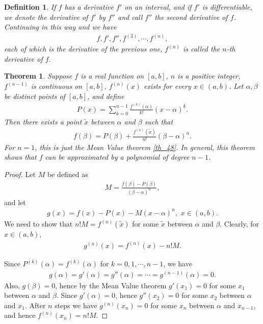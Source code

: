 \documentclass[11pt]{book}
\newtheorem{definition}{Definition}[chapter]
\newtheorem{theorem}{Theorem}[chapter]
\theoremstyle{definition}
\numberwithin{equation}{chapter}
\begin{document}
\begin{definition}
If $f$ has a derivative $f'$ on an interval, and if $f'$ is differentiable, we denote the derivative of $f'$ by $f''$ and call $f''$ the second derivative of $f$. Continuing in this way and we have
\begin{align*}
    f, f', f'', f^{(3)}, \cdots, f^{(n)},
\end{align*}
each of which is the derivative of the previous one, $f^{(n)}$ is called the $n$-th derivative of $f$.
\end{definition}

\medskip

\begin{theorem}
Suppose $f$ is a real function on $[a,b]$, $n$ is a positive integer, $f^{(n-1)}$ is continuous on $[a,b]$, $f^{(n)}(x)$ exists for every $x \in (a,b)$. Let $\alpha, \beta$ be distinct points of $[a,b]$, and define
\begin{align*}
    P(x) = \sum^{n-1}_{k=0} \frac{f^{(k)}(\alpha)}{k!} (x - \alpha)^k.
\end{align*}
Then there exists a point $\widetilde{x}$ between $\alpha$ and $\beta$ such that
\begin{align*}
    f(\beta) = P(\beta) + \frac{f^{(n)}(\widetilde{x})}{n!} (\beta - \alpha)^n.
\end{align*}
For $n = 1$, this is just the Mean Value theorem \ref{th_48}. In general, this theorem shows that $f$ can be approximated by a polynomial of degree $n - 1$.
\end{theorem}
\begin{proof}
Let $M$ be defined as 
\begin{align*}
    M = \frac{f(\beta) - P(\beta)}{(\beta - \alpha)^n},
\end{align*}
and let 
\begin{align*}
    g(x) = f(x) - P(x) - M(x - \alpha)^n, \,\, x \in (a,b).
\end{align*}
We need to show that $n!M = f^{(n)}(\widetilde{x})$ for some $\widetilde{x}$ between $\alpha$ and $\beta$. Clearly, for $x \in (a,b)$,
\begin{align*}
    g^{(n)}(x) = f^{(n)}(x) - n!M.
\end{align*}

Since $P^{(k)}(\alpha) = f^{(k)}(\alpha)$ for $k = 0,1,\cdots,n-1$, we have
\begin{align*}
    g(\alpha) = g'(\alpha) = g''(\alpha) = \cdots = g^{(n-1)}(\alpha) = 0.
\end{align*}
Also, $g(\beta) = 0$, hence by the Mean Value theorem $g'(x_1) = 0$ for some $x_1$ between $\alpha$ and $\beta$. Since $g'(\alpha) = 0$, hence $g''(x_2) = 0$ for some $x_2$ between $\alpha$ and $x_1$. After $n$ steps we have $g^{(n)}(x_n) = 0$ for some $x_n$ between $\alpha$ and $x_{n-1}$, and hence $f^{(n)}(x_n) = n!M$.
\end{proof}
\end{document}
